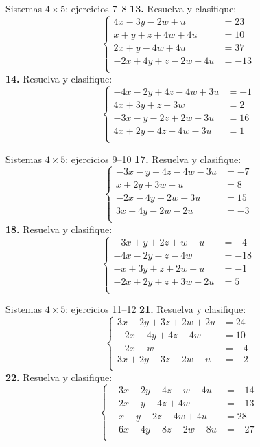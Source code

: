 \documentclass[aspectratio=169,9pt]{beamer}
\theoremstyle{remark}
\begin{document}
\begin{frame}{Sistemas $4\times 5$: ejercicios 7--8}
\scriptsize
\textbf{13.} Resuelva y clasifique:
\[\left\{\begin{aligned}
4x-3y-2w+u&=23\\
x+y+z+4w+4u&=10\\
2x+y-4w+4u&=37\\
-2x+4y+z-2w-4u&=-13\\
\end{aligned}\right.\]
\textbf{14.} Resuelva y clasifique:
\[\left\{\begin{aligned}
-4x-2y+4z-4w+3u&=-1\\
4x+3y+z+3w&=2\\
-3x-y-2z+2w+3u&=16\\
4x+2y-4z+4w-3u&=1\\
\end{aligned}\right.\]
\end{frame}
\begin{frame}{Sistemas $4\times 5$: ejercicios 9--10}
\scriptsize
\textbf{17.} Resuelva y clasifique:
\[\left\{\begin{aligned}
-3x-y-4z-4w-3u&=-7\\
x+2y+3w-u&=8\\
-2x-4y+2w-3u&=15\\
3x+4y-2w-2u&=-3\\
\end{aligned}\right.\]
\textbf{18.} Resuelva y clasifique:
\[\left\{\begin{aligned}
-3x+y+2z+w-u&=-4\\
-4x-2y-z-4w&=-18\\
-x+3y+z+2w+u&=-1\\
-2x+2y+z+3w-2u&=5\\
\end{aligned}\right.\]
\end{frame}
\begin{frame}{Sistemas $4\times 5$: ejercicios 11--12}
\scriptsize
\textbf{21.} Resuelva y clasifique:
\[\left\{\begin{aligned}
3x-2y+3z+2w+2u&=24\\
-2x+4y+4z-4w&=10\\
-2x-w&=-4\\
3x+2y-3z-2w-u&=-2\\
\end{aligned}\right.\]
\textbf{22.} Resuelva y clasifique:
\[\left\{\begin{aligned}
-3x-2y-4z-w-4u&=-14\\
-2x-y-4z+4w&=-13\\
-x-y-2z-4w+4u&=28\\
-6x-4y-8z-2w-8u&=-27\\
\end{aligned}\right.\]
\end{frame}
\end{document}
